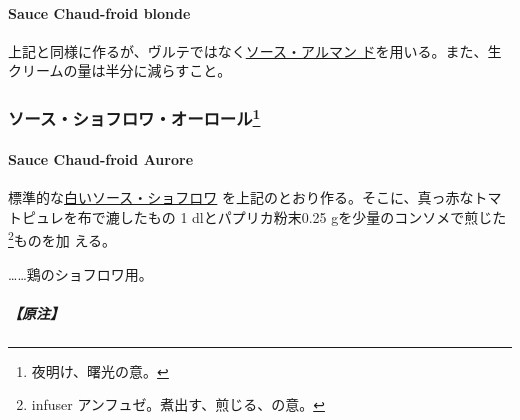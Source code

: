 \begin{recette}
\hypertarget{sauce-chaud-froid-blonde}{%
\paragraph{Sauce Chaud-froid blonde}\label{sauce-chaud-froid-blonde}}


上記と同様に作るが、ヴルテではなく\protect\hyperlink{sauce-allemande}{ソース・アルマン
ド}を用いる。また、生クリームの量は半分に減らすこと。

\maeaki

\hypertarget{ux30bdux30fcux30b9ux30b7ux30e7ux30d5ux30edux30efux30aaux30fcux30edux30fcux30eb28}{%
\subsubsection[ソース・ショフロワ・オーロール]{\texorpdfstring{ソース・ショフロワ・オーロール\footnote{夜明け、曙光の意。}}{ソース・ショフロワ・オーロール}}\label{ux30bdux30fcux30b9ux30b7ux30e7ux30d5ux30edux30efux30aaux30fcux30edux30fcux30eb28}}

\hypertarget{sauce-chaud-froid-aurore}{%
\paragraph{Sauce Chaud-froid Aurore}\label{sauce-chaud-froid-aurore}}


標準的な\protect\hyperlink{sauce-chaud-froid-blanche-ordinaire}{白いソース・ショフロワ}
を上記のとおり作る。そこに、真っ赤なトマトピュレを布で漉したもの
1\undemi{} dlとパプリカ粉末0.25 gを少量のコンソメで煎じた\footnote{infuser
  アンフュゼ。煮出す、煎じる、の意。}ものを加 える。

\ldots{}\ldots{}鶏のショフロワ用。

\hypertarget{ux539fux6ce8-3}{%
\subparagraph{【原注】}\label{ux539fux6ce8-3}}


\end{recette}
